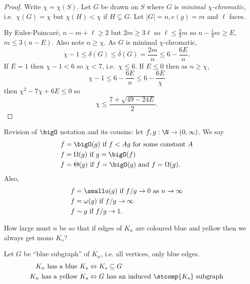\documentclass[a4paper]{article}
\newcommand*{\Omg}{\Omega}
\newcommand*{\bigT}{\Theta}
\newcommand*{\smallomg}{\omega}
\begin{document}
\begin{proof}
  Write \(\chi = \chi(S)\). Let \(G\) be drawn on \(S\) where \(G\) is \emph{minimal \(\chi\)-chromatic}, i.e.\ \(\chi(G) = \chi\) but \(\chi(H) < \chi\) if \(H \subsetneq G\). Let \(|G| = n, e(g) = m\) and \(\ell\) faces.

  By Euler-Poincaré, \(n - m + \ell \geq 2\) but \(2m \geq 3\ell\) so \(\ell \leq \frac{2}{3}m\) so \(n - \frac{1}{3}m \geq E\), \(m \leq 3(n - E)\). Also note \(n \geq \chi\). As \(G\) is minimal \(\chi\)-chromatic,
  \[
    \chi - 1 \leq \delta(G) \leq \overline \delta(G) = \frac{2m}{n} \leq 6 - \frac{6E}{n}.
  \]
  If \(E = 1\) then \(\chi - 1 < 6\) so \(\chi < 7\), i.e.\ \(\chi \leq 6\). If \(E \leq 0\) then as \(n \geq \chi\),
  \[
    \chi - 1 \leq 6 - \frac{6E}{n} \leq 6 - \frac{6E}{\chi}
  \]
  then \(\chi^2 - 7\chi + 6E \leq 0\) so
  \[
    \chi \leq \frac{7 + \sqrt{49 - 24E}}{2}.
  \]
\end{proof}










\iffalse

Revision of \(\bigO\) notation and its cousins: let \(f,g:\N\to (0,\infty)\). We say
\begin{align*}
  f &= \bigO(g) \text{ if } f< Ag \text{ for some constant } A \\
  f &= \Omg(g) \text{ if } g=\bigO(f) \\
  f &= \bigT(g) \text{ if } f=\bigO(g) \text{ and } f = \Omg(g).
\end{align*}
Also,
\begin{align*}
  f &= \smallo(g) \text{ if } f/g\to 0 \text{ as } n\to \infty \\
  f &= \smallomg(g) \text{ if } f/g\to \infty \\
  f &\sim g \text{ if } f/g\to 1.
\end{align*}



\begin{question}
  How large must \(n\) be so that if edges of \(K_n\) are coloured blue and yellow then we always get mono \(K_s\)?
\end{question}

Let \(G\) be ``blue subgraph'' of \(K_n\), i.e. all vertices, only blue edges.
\begin{align*}
  K_n \text{ has a blue } K_s &\Leftrightarrow K_s \subseteq G \\
  K_n \text{ has a yellow } K_s &\Leftrightarrow G \text{ has an induced } \stcomp{K_s} \text{ subgraph}
\end{align*}
\end{document}

